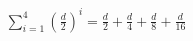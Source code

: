 \documentclass[preview]{standalone}
\begin{document}
\begin{align*}
\sum_{i=1}^{4} \left(\frac{d}{2}\right)^i =\frac{d}{2} + \frac{d}{4} + \frac{d}{8} + \frac{d}{16}
\end{align*}
\end{document}
